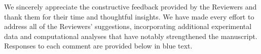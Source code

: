 We sincerely appreciate the constructive feedback provided by the Reviewers and thank them for their time and thoughtful insights. We have made every effort to address all of the Reviewers' suggestions, incorporating additional experimental data and computational analyses that have notably strengthened the manuscript. Responses to each comment are provided below in blue text.
